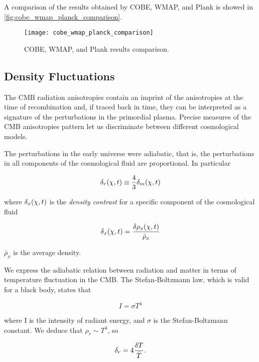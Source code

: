 A comparison of the results obtained by COBE, WMAP, and Plank is showed in
\autoref{fig:cobe_wmap_planck_comparison}.

\begin{figure}
        \centering
        \texttt{[image: cobe\_wmap\_planck\_comparison]}
        \caption{COBE, WMAP, and Plank results comparison.}
        \label{fig:cobe_wmap_planck_comparison}
\end{figure}

\subsection{Density Fluctuations}

The CMB radiation anisotropies contain an imprint of the anisotropies at
the time of recombination and, if traced back in time, they can be
interpreted as a signature of the perturbations in the primordial plasma.
Precise measures of the CMB anisotropies pattern let us discriminate
between different cosmological models.

The perturbations in the early universe were adiabatic, that is, the
perturbations in all components of the cosmological fluid are proportional.
In particular

\begin{equation}
        \delta_r\qty(\vb{\chi},t) \equiv \frac{4}{3} \delta_m\qty(\vb{\chi},t)
\end{equation}

where $\delta_x\qty(\vb{\chi},t)$ is the \emph{density contrast} for a
specific component of the cosmological fluid

\begin{equation}
        \delta_x\qty(\vb{\chi},t) = \frac{\var{\rho_x\qty(\vb{\chi},t)}}{\bar \rho_x}
\end{equation}

$\bar \rho_x$ is the average density.

We express the adiabatic relation between radiation and matter in terms of
temperature fluctuation in the CMB. The Stefan-Boltzmann law, which is
valid for a black body, states that

\begin{equation}
        I = \sigma T^4
\end{equation}

where I is the intensity of radiant energy, and $\sigma$ is the
Stefan-Boltzmann constant. We deduce that $\rho_r \sim T^4$, so

\begin{equation}
        \delta_r = 4 \frac{\var{T}}{\bar T}.
\end{equation}

